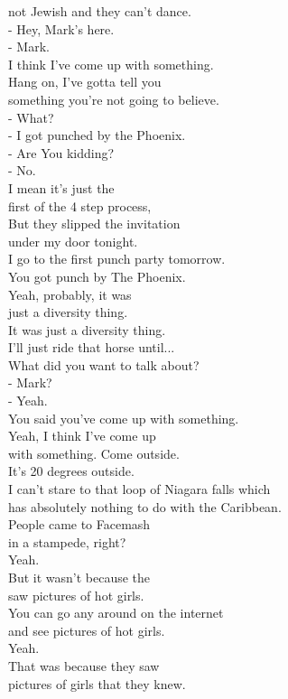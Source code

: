 \documentclass{article}
\begin{document}
\begin{multicols}{3}
not Jewish and they can't dance.\\
- Hey, Mark's here.\\
- Mark.\\
I think I've come up with something.\\
Hang on, I've gotta tell you\\
something you're not going to believe.\\
- What?\\
- I got punched by the Phoenix.\\
- Are You kidding?\\
- No.\\
I mean it's just the\\
first of the 4 step process,\\
But they slipped the invitation\\
under my door tonight.\\
I go to the first punch party tomorrow.\\
You got punch by The Phoenix.\\
Yeah, probably, it was\\
just a diversity thing.\\
It was just a diversity thing.\\
I'll just ride that horse until...\\
What did you want to talk about?\\
- Mark?\\
- Yeah.\\
You said you've come up with something.\\
Yeah, I think I've come up\\
with something. Come outside.\\
It's 20 degrees outside.\\
I can't stare to that loop of Niagara falls which\\
has absolutely nothing to do with the Caribbean.\\
People came to Facemash\\
in a stampede, right?\\
Yeah.\\
But it wasn't because the\\
saw pictures of hot girls.\\
You can go any around on the internet\\
and see pictures of hot girls.\\
Yeah.\\
That was because they saw\\
pictures of girls that they knew.\\

\end{multicols}
\end{document}
